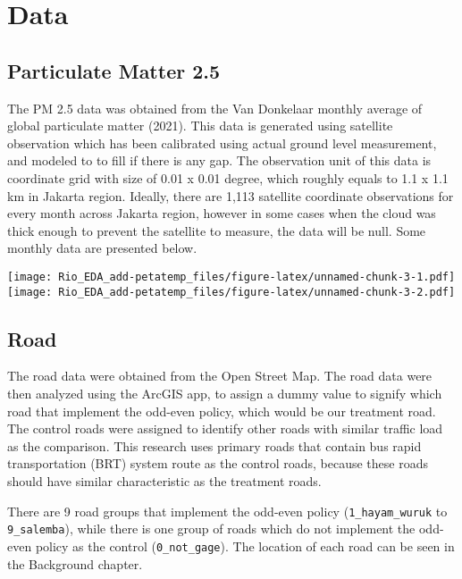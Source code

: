 \documentclass[
]{article}
\begin{document}
\hypertarget{data}{%
\section{Data}\label{data}}

\hypertarget{particulate-matter-2.5}{%
\subsection{Particulate Matter 2.5}\label{particulate-matter-2.5}}

The PM 2.5 data was obtained from the Van Donkelaar monthly average of
global particulate matter (2021). This data is generated using satellite
observation which has been calibrated using actual ground level
measurement, and modeled to to fill if there is any gap. The observation
unit of this data is coordinate grid with size of 0.01 x 0.01 degree,
which roughly equals to 1.1 x 1.1 km in Jakarta region. Ideally, there
are 1,113 satellite coordinate observations for every month across
Jakarta region, however in some cases when the cloud was thick enough to
prevent the satellite to measure, the data will be null. Some monthly
data are presented below.

\texttt{[image: Rio\_EDA\_add-petatemp\_files/figure-latex/unnamed-chunk-3-1.pdf]}
\texttt{[image: Rio\_EDA\_add-petatemp\_files/figure-latex/unnamed-chunk-3-2.pdf]}

\hypertarget{road}{%
\subsection{Road}\label{road}}

The road data were obtained from the Open Street Map. The road data were
then analyzed using the ArcGIS app, to assign a dummy value to signify
which road that implement the odd-even policy, which would be our
treatment road. The control roads were assigned to identify other roads
with similar traffic load as the comparison. This research uses primary
roads that contain bus rapid transportation (BRT) system route as the
control roads, because these roads should have similar characteristic as
the treatment roads.

There are 9 road groups that implement the odd-even policy
(\texttt{1\_hayam\_wuruk} to \texttt{9\_salemba}), while there is one
group of roads which do not implement the odd-even policy as the control
(\texttt{0\_not\_gage}). The location of each road can be seen in the
Background chapter.
\end{document}
